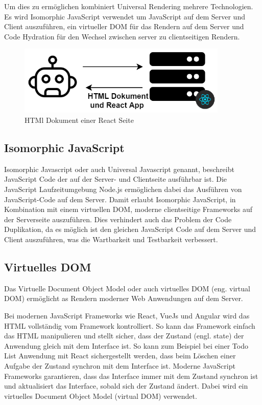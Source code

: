 \documentclass[runningheads]{llncs}
\begin{document}
Um dies zu ermöglichen kombiniert Universal Rendering mehrere Technologien. 
Es wird Isomorphic JavaScript verwendet um JavaScript auf dem Server und Client auszuführen, 
ein virtueller DOM für das Rendern auf dem Server und 
Code Hydration für den Wechsel zwischen server zu clientseitigen Rendern.

\begin{figure}[h]
  \centering
  \includegraphics[width=10cm]{images/universalseo}
  \caption{HTMl Dokument einer React Seite}
\end{figure}

\subsection{Isomorphic JavaScript}
\label{subsec:Isomorphic JavaScript}
Isomorphic Javascript oder auch Universal Javascript genannt, 
beschreibt JavaScript Code der auf der Server- und Clientseite ausführbar ist. 
Die JavaScript Laufzeitumgebung Node.js ermöglichen dabei 
das Ausführen von JavaScript-Code auf dem Server. 
Damit erlaubt Isomorphic JavaScript, 
in Kombination mit einem virtuellen DOM, moderne clientseitige Frameworks auf der Serverseite auszuführen. 
Dies verhindert auch das Problem der Code Duplikation, 
da es möglich ist den gleichen JavaScript Code auf dem Server und Client auszuführen, 
was die Wartbarkeit und Testbarkeit verbessert.

\subsection{Virtuelles DOM}
\label{subsec:Virtuelles DOM}
Das Virtuelle Document Object Model
oder auch virtuelles DOM (eng. virtual DOM) ermöglicht 
as Rendern moderner Web Anwendungen auf dem Server.

Bei modernen JavaScript Frameworks wie React, 
VueJs und Angular wird das HTML vollständig vom Framework kontrolliert. 
So kann das Framework einfach das HTML manipulieren und stellt sicher, 
dass der Zustand (engl. state) der Anwendung gleich mit dem Interface ist. 
So kann zum Beispiel bei einer Todo List Anwendung mit React sichergestellt werden, 
dass beim Löschen einer Aufgabe der Zustand synchron mit dem Interface ist. 
Moderne JavaScript Frameworks garantieren, 
dass das Interface immer mit dem Zustand synchron ist und aktualisiert das Interface, 
sobald sich der Zustand ändert. 
Dabei wird ein virtuelles Document Object Model (virtual DOM) verwendet.
\end{document}
